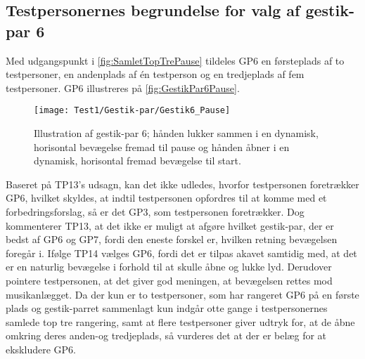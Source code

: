 \subsection{Testpersonernes begrundelse for valg af gestik-par 6}
\label{TestresultaterValgAfGestikkerBegrundelseGP6Pause}
%
Med udgangspunkt i \autoref{fig:SamletTopTrePause} tildeles GP6 en førsteplads af to testpersoner, en andenplads af én testperson og en tredjeplads af fem testpersoner. GP6 illustreres på \autoref{fig:GestikPar6Pause}.
%
\begin{figure}[H]
	\centering
	\texttt{[image: Test1/Gestik-par/Gestik6\_Pause]}
	\caption{Illustration af gestik-par 6; hånden lukker sammen i en dynamisk, horisontal bevægelse fremad til pause og hånden åbner i en dynamisk, horisontal fremad bevægelse til start.}
	\label{fig:GestikPar6Pause}
\end{figure}
\noindent
%
Baseret på TP13's udsagn, kan det ikke udledes, hvorfor testpersonen foretrækker GP6, hvilket skyldes, at indtil testpersonen opfordres til at komme med et forbedringsforslag, så er det GP3, som testpersonen foretrækker. Dog kommenterer TP13, at det ikke er muligt at afgøre hvilket gestik-par, der er bedst af GP6 og GP7, fordi den eneste forskel er, hvilken retning bevægelsen foregår i. Ifølge TP14 vælges GP6, fordi det er tilpas akavet samtidig med, at det er en naturlig bevægelse i forhold til at skulle åbne og lukke lyd. Derudover pointere testpersonen, at det giver god meningen, at bevægelsen rettes mod musikanlægget. Da der kun er to testpersoner, som har rangeret GP6 på en første plads og gestik-parret sammenlagt kun indgår otte gange i testpersonernes samlede top tre rangering, samt at flere testpersoner giver udtryk for, at de åbne omkring deres anden-og tredjeplads, så vurderes det at der er belæg for at ekskludere GP6. 
%
